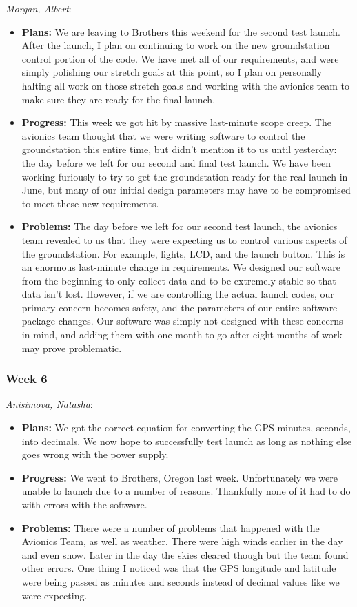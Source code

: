 \documentclass[10pt,draftclsnofoot,onecolumn]{IEEEtran}
\newcommand{\subsubsubsection}[1]{
	\hfill\break\textit{#1}:
}
\begin{document}
\subsubsubsection{Morgan, Albert}
\begin{itemize}
	\item \textbf{Plans: }
	We are leaving to Brothers this weekend for the second test launch. After the launch, I plan on continuing to work on the new groundstation control portion of the code. We have met all of our requirements, and were simply polishing our stretch goals at this point, so I plan on personally halting all work on those stretch goals and working with the avionics team to make sure they are ready for the final launch.
	\item \textbf{Progress: }
	This week we got hit by massive last-minute scope creep. The avionics team thought that we were writing software to control the groundstation this entire time, but didn't mention it to us until yesterday: the day before we left for our second and final test launch. We have been working furiously to try to get the groundstation ready for the real launch in June, but many of our initial design parameters may have to be compromised to meet these new requirements.
	\item \textbf{Problems: }
	The day before we left for our second test launch, the avionics team revealed to us that they were expecting us to control various aspects of the groundstation. For example, lights, LCD, and the launch button. This is an enormous last-minute change in requirements. We designed our software from the beginning to only collect data and to be extremely stable so that data isn't lost. However, if we are controlling the actual launch codes, our primary concern becomes safety, and the parameters of our entire software package changes. Our software was simply not designed with these concerns in mind, and adding them with one month to go after eight months of work may prove problematic.
\end{itemize}

\subsubsection{Week 6}
\subsubsubsection{Anisimova, Natasha}
\begin{itemize}
	\item \textbf{Plans: }
	We got the correct equation for converting the GPS minutes, seconds, into decimals. We now hope to successfully test launch as long as nothing else goes wrong with the power supply.
	\item \textbf{Progress:  }
	We went to Brothers, Oregon last week. Unfortunately we were unable to launch due to a number of reasons. Thankfully none of it had to do with errors with the software.
	\item \textbf{Problems: }
	There were a number of problems that happened with the Avionics Team, as well as weather. There were high winds earlier in the day and even snow. Later in the day the skies cleared though but the team found other errors. One thing I noticed was that the GPS longitude and latitude were being passed as minutes and seconds instead of decimal values like we were expecting.
\end{itemize}
\end{document}
